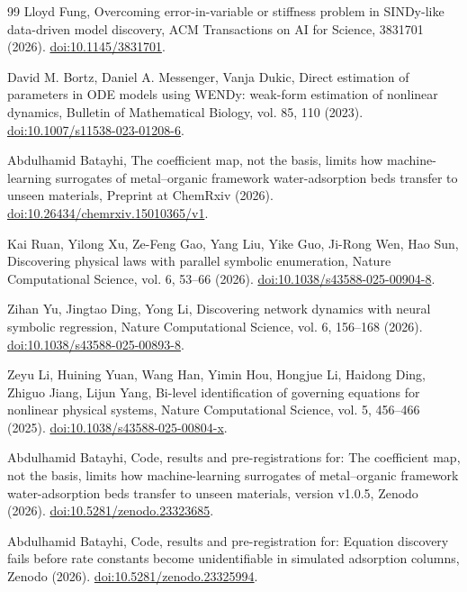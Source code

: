 \begin{thebibliography}{99}
 Lloyd Fung, Overcoming error-in-variable or stiffness problem in SINDy-like data-driven model discovery, ACM Transactions on AI for Science, 3831701 (2026). \href{https://doi.org/10.1145/3831701}{doi:10.1145/3831701}.

 David M. Bortz, Daniel A. Messenger, Vanja Dukic, Direct estimation of parameters in ODE models using WENDy: weak-form estimation of nonlinear dynamics, Bulletin of Mathematical Biology, vol. 85, 110 (2023). \href{https://doi.org/10.1007/s11538-023-01208-6}{doi:10.1007/s11538-023-01208-6}.

 Abdulhamid Batayhi, The coefficient map, not the basis, limits how machine-learning surrogates of metal--organic framework water-adsorption beds transfer to unseen materials, Preprint at ChemRxiv (2026). \href{https://doi.org/10.26434/chemrxiv.15010365/v1}{doi:10.26434/chemrxiv.15010365/v1}.

 Kai Ruan, Yilong Xu, Ze-Feng Gao, Yang Liu, Yike Guo, Ji-Rong Wen, Hao Sun, Discovering physical laws with parallel symbolic enumeration, Nature Computational Science, vol. 6, 53--66 (2026). \href{https://doi.org/10.1038/s43588-025-00904-8}{doi:10.1038/s43588-025-00904-8}.

 Zihan Yu, Jingtao Ding, Yong Li, Discovering network dynamics with neural symbolic regression, Nature Computational Science, vol. 6, 156--168 (2026). \href{https://doi.org/10.1038/s43588-025-00893-8}{doi:10.1038/s43588-025-00893-8}.

 Zeyu Li, Huining Yuan, Wang Han, Yimin Hou, Hongjue Li, Haidong Ding, Zhiguo Jiang, Lijun Yang, Bi-level identification of governing equations for nonlinear physical systems, Nature Computational Science, vol. 5, 456--466 (2025). \href{https://doi.org/10.1038/s43588-025-00804-x}{doi:10.1038/s43588-025-00804-x}.

 Abdulhamid Batayhi, Code, results and pre-registrations for: The coefficient map, not the basis, limits how machine-learning surrogates of metal--organic framework water-adsorption beds transfer to unseen materials, version v1.0.5, Zenodo (2026). \href{https://doi.org/10.5281/zenodo.23323685}{doi:10.5281/zenodo.23323685}.

 Abdulhamid Batayhi, Code, results and pre-registration for: Equation discovery fails before rate constants become unidentifiable in simulated adsorption columns, Zenodo (2026). \href{https://doi.org/10.5281/zenodo.23325994}{doi:10.5281/zenodo.23325994}.


\end{thebibliography}

